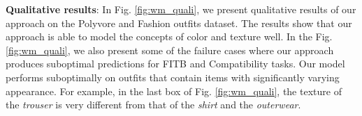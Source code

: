 \documentclass[sigconf]{acmart}
\begin{document}
\vspace{1mm}
\noindent \textbf{Qualitative results}: In Fig. \ref{fig:wm_quali}, we present qualitative results of our approach on the Polyvore and Fashion outfits dataset. The results show that our approach is able to model the concepts of color and texture well. In the Fig. \ref{fig:wm_quali}, we also present some of the failure cases where our approach produces suboptimal predictions for FITB and Compatibility tasks. Our model performs suboptimally on outfits that contain items with significantly varying appearance. For example, in the last box of Fig. \ref{fig:wm_quali}, the texture of the \textit{trouser} is very different from that of the \textit{shirt} and the \textit{outerwear}. 








\begin{comment}
\begin{table}[t]
    \centering
    \caption{Comparison of number of trainable model parameters. Lower the \#params, the better. Our model size is smaller and performs on par with fully supervised methods on the Polyvore}
    \vspace{1mm}
    \resizebox{0.98\columnwidth}{!}{
    \setlength{\tabcolsep}{3pt}
    \begin{tabular}{l|c|cc|c}
    \hline
        Method &  & FITB & Comp. & \#params  \\
        \hline
        
        CSN T1:1 + VSE \cite{csn} & {\color{red} 100\%} & \underline{54.5} & \underline{0.84} & 3.2M \\
        Type-Aware \cite{eccv2018learning} & {\color{red} 100\%} & 56.2 & \underline{0.86} & 3.2M \\ 
        Type-Aware \cite{eccv2018learning} (66 FCs) & {\color{red} 100\%} & 56.6 & \underline{0.86} &  3.5M \\ 
        SCE-Net (avg)  \cite{iccv2019learning} & {\color{red} 100\%} & 59.1 & 0.88 & 3.2M \\ 
        \hline
        \textit{Ours} & {\color{algoGreen} 5\%} & 54.9 & 0.86 & \textbf{2.8M} \\ 
        \hline
        
    \end{tabular}
    }
    \label{tab:params}
\end{table}
\end{comment}

 
\end{document}
